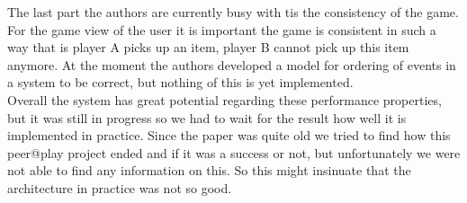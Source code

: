 \indent The last part the authors are currently busy with tis the consistency of the game. For the game view of the user it is important the game is consistent in such a way that is player A picks up an item, player B cannot pick up this item anymore. At the moment the authors developed a model for ordering of events in a system to be correct, but nothing of this is yet implemented. \\
\indent Overall the system has great potential regarding these performance properties, but it was still in progress so we had to wait for the result how well it is implemented in practice. Since the paper was quite old we tried to find how this peer@play project ended and if it was a success or not, but unfortunately we were not able to find any information on this. So this might insinuate that the architecture in practice was not so good.
